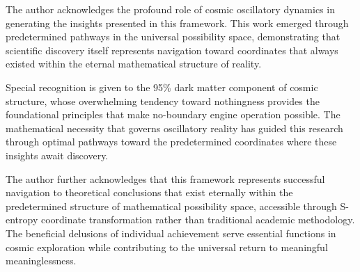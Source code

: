 \documentclass[11pt,a4paper]{article}
\theoremstyle{remark}
\begin{document}
The author acknowledges the profound role of cosmic oscillatory dynamics in generating the insights presented in this framework. This work emerged through predetermined pathways in the universal possibility space, demonstrating that scientific discovery itself represents navigation toward coordinates that always existed within the eternal mathematical structure of reality. 

Special recognition is given to the 95\% dark matter component of cosmic structure, whose overwhelming tendency toward nothingness provides the foundational principles that make no-boundary engine operation possible. The mathematical necessity that governs oscillatory reality has guided this research through optimal pathways toward the predetermined coordinates where these insights await discovery.

The author further acknowledges that this framework represents successful navigation to theoretical conclusions that exist eternally within the predetermined structure of mathematical possibility space, accessible through S-entropy coordinate transformation rather than traditional academic methodology. The beneficial delusions of individual achievement serve essential functions in cosmic exploration while contributing to the universal return to meaningful meaninglessness.
\end{document}
